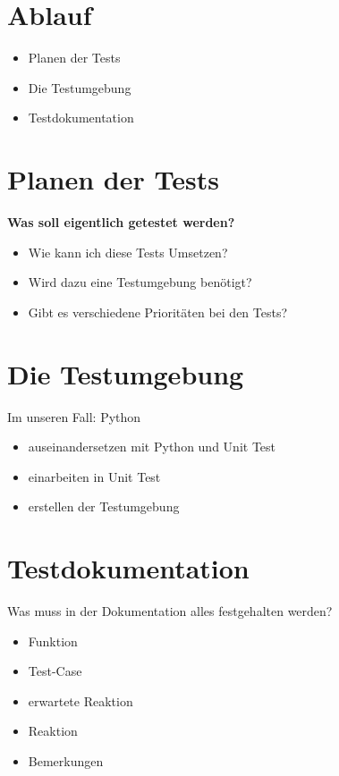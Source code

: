 \documentclass[ignorenonframetext, 11pt, table]{beamer}
\begin{document}
\section*{Ablauf}
\begin{frame}
	\begin{itemize}
		\item Planen der Tests
		\item Die Testumgebung
		\item Testdokumentation
	\end{itemize}
\end{frame}

\section*{Planen der Tests}
\begin{frame}
	\textbf{Was soll eigentlich getestet werden?} \newline
	\pause
	\begin{itemize}
		\item Wie kann ich diese Tests Umsetzen?
		\item Wird dazu eine Testumgebung benötigt?
		\item Gibt es verschiedene Prioritäten bei den Tests?
	\end{itemize}
\end{frame}

\section*{Die Testumgebung}
\begin{frame}
	Im unseren Fall: Python
	\begin{itemize}
		\item auseinandersetzen mit Python und Unit Test
		\item einarbeiten in Unit Test
		\item erstellen der Testumgebung
	\end{itemize}
\end{frame}

\section*{Testdokumentation}
\begin{frame}
	Was muss in der Dokumentation alles festgehalten werden?
	\begin{itemize}
		\item Funktion
		\item Test-Case
		\item erwartete Reaktion
		\item Reaktion
		\item Bemerkungen
	\end{itemize}
\end{frame}
\end{document}
